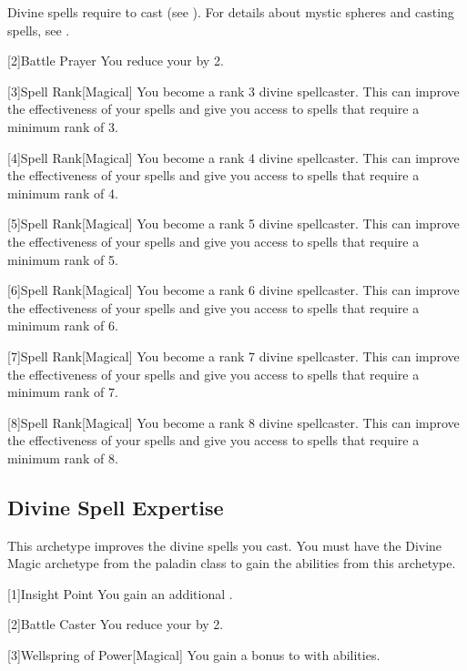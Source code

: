         Divine spells require  to cast (see ).
        For details about mystic spheres and casting spells, see .

        [2]{Battle Prayer} You reduce your  by 2.

        [3]{Spell Rank}[Magical] You become a rank 3 divine spellcaster.
        This can improve the effectiveness of your spells and give you access to spells that require a minimum rank of 3.

        [4]{Spell Rank}[Magical] You become a rank 4 divine spellcaster.
        This can improve the effectiveness of your spells and give you access to spells that require a minimum rank of 4.

        [5]{Spell Rank}[Magical] You become a rank 5 divine spellcaster.
        This can improve the effectiveness of your spells and give you access to spells that require a minimum rank of 5.

        [6]{Spell Rank}[Magical] You become a rank 6 divine spellcaster.
        This can improve the effectiveness of your spells and give you access to spells that require a minimum rank of 6.

        [7]{Spell Rank}[Magical] You become a rank 7 divine spellcaster.
        This can improve the effectiveness of your spells and give you access to spells that require a minimum rank of 7.

        [8]{Spell Rank}[Magical] You become a rank 8 divine spellcaster.
        This can improve the effectiveness of your spells and give you access to spells that require a minimum rank of 8.

    \subsection{Divine Spell Expertise}
        This archetype improves the divine spells you cast.
        You must have the Divine Magic archetype from the paladin class to gain the abilities from this archetype.

        [1]{Insight Point} You gain an additional .

        [2]{Battle Caster} You reduce your  by 2.

        [3]{Wellspring of Power}[Magical]
        You gain a  bonus to  with  abilities.

